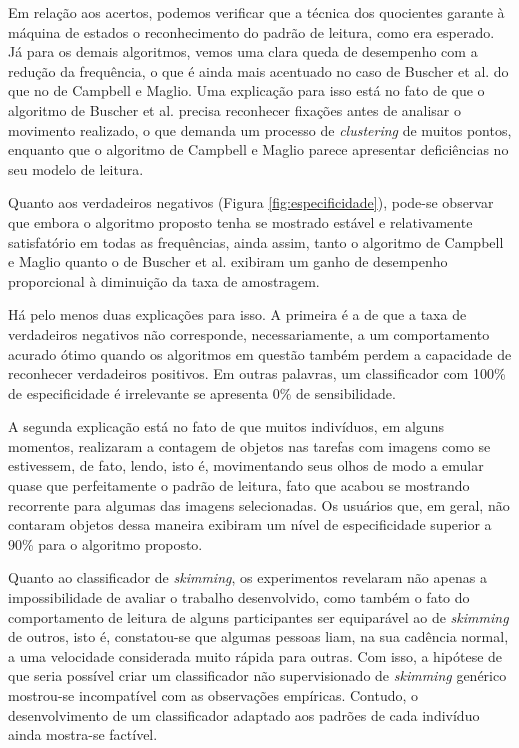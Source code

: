 \documentclass[12pt]{article}
\begin{document}
		Em relação aos acertos, podemos verificar que a técnica dos quocientes garante à máquina de estados o reconhecimento do padrão de leitura, como era esperado. Já para os demais algoritmos, vemos uma clara queda de desempenho com a redução da frequência, o que é ainda mais acentuado no caso de Buscher et al. do que no de Campbell e Maglio. Uma explicação para isso está no fato de que o algoritmo de Buscher et al. precisa reconhecer fixações antes de analisar o movimento realizado, o que demanda um processo de \textit{clustering} de muitos pontos, enquanto que o algoritmo de Campbell e Maglio parece apresentar deficiências no seu modelo de leitura.
		
		Quanto aos verdadeiros negativos (Figura \ref{fig:especificidade}), pode-se observar que embora o algoritmo proposto tenha se mostrado estável e relativamente satisfatório em todas as frequências, ainda assim, tanto o algoritmo de Campbell e Maglio quanto o de Buscher et al. exibiram um ganho de desempenho proporcional à diminuição da taxa de amostragem. 
		
		Há pelo menos duas explicações para isso. A primeira é a de que a taxa de verdadeiros negativos não corresponde, necessariamente, a um comportamento acurado ótimo quando os algoritmos em questão também perdem a capacidade de reconhecer verdadeiros positivos. Em outras palavras, um classificador com 100\% de especificidade é irrelevante se apresenta 0\% de sensibilidade.
		
		A segunda explicação está no fato de que muitos indivíduos, em alguns momentos, realizaram a contagem de objetos nas tarefas com imagens como se estivessem, de fato, lendo, isto é, movimentando seus olhos de modo a emular quase que perfeitamente o padrão de leitura, fato que acabou se mostrando recorrente para algumas das imagens selecionadas. Os usuários que, em geral, não contaram objetos dessa maneira exibiram um nível de especificidade superior a 90\% para o algoritmo proposto.
		
		Quanto ao classificador de \textit{skimming}, os experimentos revelaram não apenas a impossibilidade de avaliar o trabalho desenvolvido, como também o fato do comportamento de leitura de alguns participantes ser equiparável ao de \textit{skimming} de outros, isto é, constatou-se que algumas pessoas liam, na sua cadência normal, a uma velocidade considerada muito rápida para outras. Com isso, a hipótese de que seria possível criar um classificador não supervisionado de \textit{skimming} genérico mostrou-se incompatível com as observações empíricas. Contudo, o desenvolvimento de um classificador adaptado aos padrões de cada indivíduo ainda mostra-se factível.
		
\end{document}
